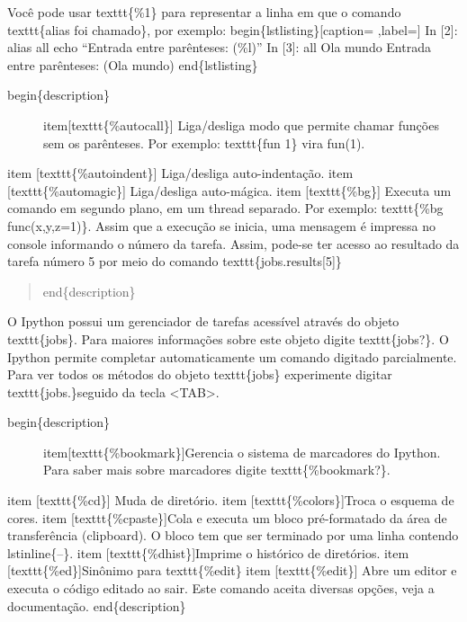 \documentclass[a4paper,10pt,brazil]{sphinxmanual}
\begin{document}
Você pode usar texttt\{\%1\} para representar a linha em que o comando texttt\{alias foi chamado\}, por exemplo:
begin\{lstlisting\}{[}caption= ,label={]}
In {[}2{]}: alias all echo ``Entrada entre parênteses: (\%l)''
In {[}3{]}: all Ola mundo
Entrada entre parênteses: (Ola mundo)
end\{lstlisting\}
\begin{description}
\item[{begin\{description\}}] \leavevmode
item{[}texttt\{\%autocall\}{]} Liga/desliga modo que permite chamar funções sem os parênteses. Por exemplo: texttt\{fun 1\} vira fun(1).

\end{description}

item {[}texttt\{\%autoindent\}{]} Liga/desliga auto-indentação.
item {[}texttt\{\%automagic\}{]} Liga/desliga auto-mágica.
item {[}texttt\{\%bg\}{]} Executa um comando em segundo plano, em um thread separado. Por exemplo: texttt\{\%bg func(x,y,z=1)\}. Assim que a execução se inicia, uma mensagem é impressa no console informando o número da tarefa. Assim, pode-se ter acesso ao resultado da tarefa número 5 por meio do comando texttt\{jobs.results{[}5{]}\}
\begin{quote}

end\{description\}
\end{quote}

O Ipython possui um gerenciador de tarefas acessível através do objeto texttt\{jobs\}. Para maiores informações sobre este objeto digite texttt\{jobs?\}. O Ipython permite completar automaticamente  um comando digitado parcialmente. Para ver todos os métodos do objeto texttt\{jobs\} experimente digitar texttt\{jobs.\}seguido da tecla \textless{}TAB\textgreater{}.
\begin{description}
\item[{begin\{description\}}] \leavevmode
item{[}texttt\{\%bookmark\}{]}Gerencia o sistema de marcadores do Ipython. Para saber mais sobre marcadores digite texttt\{\%bookmark?\}.

\end{description}

item {[}texttt\{\%cd\}{]} Muda de diretório.
item {[}texttt\{\%colors\}{]}Troca o esquema de cores.
item {[}texttt\{\%cpaste\}{]}Cola e executa um bloco pré-formatado da área de transferência (clipboard). O bloco tem que ser terminado por uma linha contendo lstinline\{--\}.
item {[}texttt\{\%dhist\}{]}Imprime o histórico de diretórios.
item {[}texttt\{\%ed\}{]}Sinônimo para texttt\{\%edit\}
item {[}texttt\{\%edit\}{]} Abre um editor e executa o código editado ao sair. Este comando aceita diversas opções, veja a documentação.
end\{description\}
\end{document}
